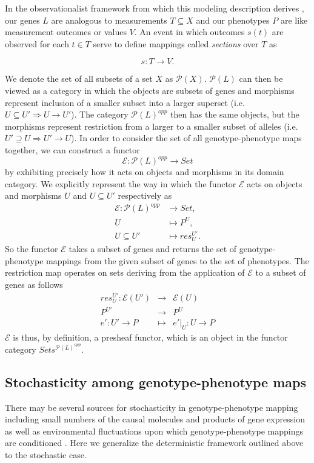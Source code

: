 In the observationalist framework from which this modeling description derives \cite{Abramsky2011}, our genes $L$ are analogous to measurements $T \subseteq X$ and our phenotypes $P$ are like measurement outcomes or values $V$. An event in which outcomes $s(t)$ are observed for each $t \in T$ serve to define mappings called \emph{sections} over $T$ as

$$
s \colon T \rightarrow V.
$$

We denote the set of all subsets of a set $X$ as $\mathcal{P}(X)$. $\mathcal{P}(L)$ can then be viewed as a category in which the objects are subsets of genes and morphisms represent inclusion of a smaller subset into a larger superset (i.e. $U \subseteq U' \Rightarrow U \rightarrow U'$). The category $\mathcal{P}(L)^{opp}$ then has the same objects, but the morphisms represent restriction from a larger to a smaller subset of alleles (i.e. $U' \supseteq U \Rightarrow U' \rightarrow U$). In order to consider the set of all genotype-phenotype maps together, we can construct a functor
$$
\mathcal{E} \colon \mathcal{P}(L)^{opp} \rightarrow Set
$$
by exhibiting precisely how it acts on objects and morphisms in its domain category. We explicitly represent the way in which the functor $\mathcal{E}$ acts on objects and morphisms $U$ and $U \subseteq U'$ respectively as
\begin{equation}\label{eq:gpfunctor}
\begin{split}
\mathcal{E} \colon \mathcal{P}(L)^{opp} &\rightarrow Set,\\
U &\mapsto P^U,\\
U \subseteq U' &\mapsto res^{U'}_{U}.
\end{split}
\end{equation}
So the functor $\mathcal{E}$ takes a subset of genes and returns the set of genotype-phenotype mappings from the given subset of genes to the set of phenotypes. The restriction map operates on sets deriving from the application of $\mathcal{E}$ to a subset of genes as follows
\begin{eqnarray*}
res^{U'}_{U} \colon \mathcal{E}(U') &\rightarrow& \mathcal{E}(U)\\
P^{U'} &\rightarrow& P^U\\
e' \colon U' \rightarrow P &\mapsto& e'|_U \colon U \rightarrow P
\end{eqnarray*}
$\mathcal{E}$ is thus, by definition, a presheaf functor, which is an object in the functor category $Sets^{\mathcal{P}(L)^{opp}}$.

\subsection*{Stochasticity among genotype-phenotype maps}
There may be several sources for stochasticity in genotype-phenotype mapping including small numbers of the causal molecules and products of gene expression as well as environmental fluctuations upon which genotype-phenotype mappings are conditioned \cite{Swain2002,Paulsson2004,Thattai2004,Acar2008a,Lestas2010,Munsky2012,Neuert2013}. Here we generalize the deterministic framework outlined above to the stochastic case.

